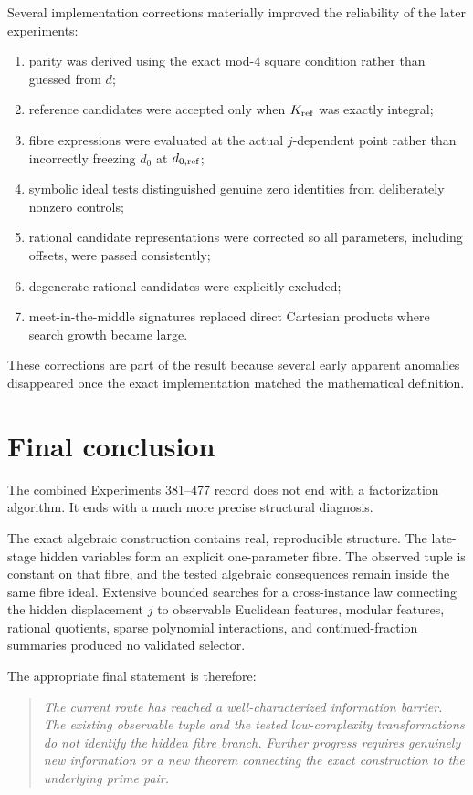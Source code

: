\documentclass[11pt,a4paper]{article}
\begin{document}
Several implementation corrections materially improved the reliability of the later experiments:
\begin{enumerate}[leftmargin=*]
\item parity was derived using the exact mod-$4$ square condition rather than guessed from $d$;
\item reference candidates were accepted only when $K_{\rm ref}$ was exactly integral;
\item fibre expressions were evaluated at the actual $j$-dependent point rather than incorrectly freezing $d_0$ at $d_{0,\rm ref}$;
\item symbolic ideal tests distinguished genuine zero identities from deliberately nonzero controls;
\item rational candidate representations were corrected so all parameters, including offsets, were passed consistently;
\item degenerate rational candidates were explicitly excluded;
\item meet-in-the-middle signatures replaced direct Cartesian products where search growth became large.
\end{enumerate}

These corrections are part of the result because several early apparent anomalies disappeared once the exact implementation matched the mathematical definition.

\section{Final conclusion}

The combined Experiments 381--477 record does not end with a factorization algorithm. It ends with a much more precise structural diagnosis.

The exact algebraic construction contains real, reproducible structure. The late-stage hidden variables form an explicit one-parameter fibre. The observed tuple is constant on that fibre, and the tested algebraic consequences remain inside the same fibre ideal. Extensive bounded searches for a cross-instance law connecting the hidden displacement $j$ to observable Euclidean features, modular features, rational quotients, sparse polynomial interactions, and continued-fraction summaries produced no validated selector.

The appropriate final statement is therefore:
\begin{quote}
\emph{The current route has reached a well-characterized information barrier. The existing observable tuple and the tested low-complexity transformations do not identify the hidden fibre branch. Further progress requires genuinely new information or a new theorem connecting the exact construction to the underlying prime pair.}
\end{quote}
\end{document}

